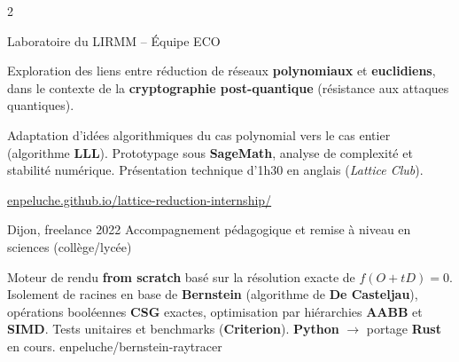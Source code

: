\documentclass[10pt,a4paper,ragged2e,withhyper]{cv}
\newcommand{\kw}[1]{\textbf{\color{name}#1}}
\begin{document}
\begin{paracol}{2}

  \vspace{0.3cm}

  {Laboratoire du LIRMM -- Équipe ECO}{
  }
  {\vspace{0.05cm}
  Exploration des liens entre réduction de réseaux \kw{polynomiaux} et \kw{euclidiens},
  dans le contexte de la \kw{cryptographie post-quantique} (résistance aux attaques quantiques).

  Adaptation d'idées algorithmiques du cas polynomial vers le cas entier (algorithme \kw{LLL}).
  Prototypage sous \kw{SageMath}, analyse de complexité et stabilité numérique.
  Présentation technique d'1h30 en anglais (\textit{Lattice Club}).

  \vspace{0.1cm}
  {\small \color{accent} \faGlobe \href{https://enpeluche.github.io/lattice-reduction-internship/}{enpeluche.github.io/lattice-reduction-internship/}}
  }
  \vspace{0.3cm}

  {Dijon, freelance}
  {2022}
  {\vspace{0.05cm}
    Accompagnement pédagogique et remise à niveau en sciences (collège/lycée)}


  \vspace{0.3cm}


  \vspace*{\fill} %

  {Moteur de rendu \kw{from scratch} basé sur la résolution exacte de $f(O+tD)=0$.
    Isolement de racines en base de \kw{Bernstein} (algorithme de \kw{De Casteljau}),
    opérations booléennes \kw{CSG} exactes, optimisation par hiérarchies \kw{AABB} et \kw{SIMD}.
    Tests unitaires et benchmarks (\kw{Criterion}). \kw{Python} $\to$ portage \kw{Rust} en cours.}
  {enpeluche/bernstein-raytracer}


  \vspace*{\fill} %


\end{paracol}
\end{document}
